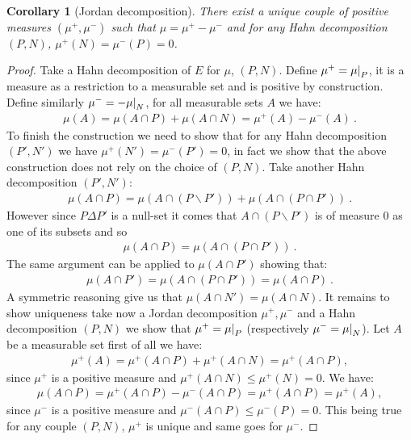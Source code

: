 \documentclass[11pt,a4paper]{article}
\newcommand\restr[2]{{%
  \left.\kern-\nulldelimiterspace %
  #1 %
  \littletaller %
  \right|_{#2} %
  }}
\newcommand{\littletaller}{\mathchoice{\vphantom{\big|}}{}{}{}}
\newtheorem{corollary}[theorem]{Corollary}
\begin{document}
\begin{corollary}[Jordan decomposition]
    There exist a unique couple of positive measures $(\mu^+,\mu^-)$ such that $\mu = \mu^+ - \mu^-$ and for any Hahn decomposition $(P,N)$, $\mu^+(N) = \mu^-(P) = 0$.
\end{corollary}
\begin{proof}
    Take a Hahn decomposition of $E$ for $\mu$, $(P,N)$. Define $\mu^+ = \restr{\mu}{P}$, it is a measure as a restriction to a measurable set and is positive by construction. Define similarly $\mu^-= - \restr{\mu}{N}$, for all measurable sets $A$ we have:
    \begin{align*}
        \mu(A) = \mu(A\cap P) + \mu(A\cap N) =  \mu^+(A) - \mu^-(A)\ .
    \end{align*}
    To finish the construction we need to show that for any Hahn decomposition $(P',N')$ we have $\mu^+(N') = \mu^-(P') = 0$, in fact we show that the above construction does not rely on the choice of $(P,N)$. Take another Hahn decomposition $(P',N')$:
    \begin{align*}
        \mu(A\cap P) = \mu(A\cap (P\backslash P')) + \mu(A\cap (P\cap P'))\ .
    \end{align*}
    However since $P\Delta P'$ is a null-set it comes that $A\cap (P\backslash P')$ is of measure $0$ as one of its subsets and so
    \begin{align*}
        \mu(A\cap P) =\mu(A\cap (P\cap P'))\ .
    \end{align*}
    The same argument can be applied to $\mu(A\cap P')$ showing that:
    \begin{align*}
        \mu(A\cap P') =\mu(A\cap (P\cap P')) = \mu(A\cap P)\ .
    \end{align*}
    A symmetric reasoning give us that $\mu(A\cap N') = \mu(A\cap N)$. It remains to show uniqueness take now a Jordan decomposition $\mu^+,\mu^-$ and a Hahn decomposition $(P,N)$ we show that $\mu^+ = \restr{\mu}{P}$ (respectively $\mu^- = \restr{\mu}{N}$). Let $A$ be a measurable set first of all we have:
    \begin{align*}
        \mu^+(A) = \mu^+(A\cap P) + \mu^+(A\cap N) = \mu^+(A\cap P),
    \end{align*}
    since $\mu^+$ is a positive measure and $\mu^+(A\cap N) \leq \mu^+(N) = 0$. We have:
    \begin{align*}
        \mu(A\cap P) = \mu^+(A\cap P) - \mu^-(A\cap P) = \mu^+(A\cap P)= \mu^+(A), 
    \end{align*}
    since $\mu^-$ is a positive measure and $\mu^-(A\cap P) \leq \mu^-(P) = 0$. This being true for any couple $(P,N)$, $\mu^+$ is unique and same goes for $\mu^-$.
\end{proof}
\end{document}
